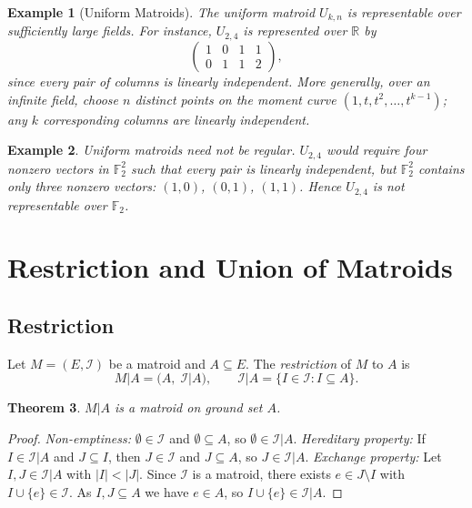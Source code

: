 \documentclass[11pt]{article}
\theoremstyle{plain}
\newtheorem{theorem}{Theorem}[section]
\newtheorem{example}[theorem]{Example}
\theoremstyle{definition}
\begin{document}
\begin{example}[Uniform Matroids]
The uniform matroid $U_{k,n}$ is representable over sufficiently large fields.
For instance, $U_{2,4}$ is represented over $\mathbb{R}$ by
\[
  \begin{pmatrix} 1 & 0 & 1 & 1 \\ 0 & 1 & 1 & 2 \end{pmatrix},
\]
since every pair of columns is linearly independent.
More generally, over an infinite field, choose $n$ distinct points on the
moment curve $(1, t, t^2, \dots, t^{k-1})$; any $k$ corresponding columns
are linearly independent.
\end{example}
 
\begin{example}
Uniform matroids need not be regular.
$U_{2,4}$ would require four nonzero vectors in $\mathbb{F}_2^2$
such that every pair is linearly independent, but $\mathbb{F}_2^2$ contains
only three nonzero vectors: $(1,0)$, $(0,1)$, $(1,1)$.
Hence $U_{2,4}$ is not representable over $\mathbb{F}_2$.
\end{example}
 
\section{Restriction and Union of Matroids}
 
\subsection{Restriction}
 
Let $M = (E, \mathcal{I})$ be a matroid and $A \subseteq E$.
The \emph{restriction} of $M$ to $A$ is
\[
  M|A = (A,\; \mathcal{I}|A), \qquad
  \mathcal{I}|A = \{I \in \mathcal{I} : I \subseteq A\}.
\]
 
\begin{theorem}
$M|A$ is a matroid on ground set $A$.
\end{theorem}
 
\begin{proof}
\emph{Non-emptiness:} $\emptyset \in \mathcal{I}$ and $\emptyset \subseteq A$,
so $\emptyset \in \mathcal{I}|A$.
\emph{Hereditary property:} If $I \in \mathcal{I}|A$ and $J \subseteq I$,
then $J \in \mathcal{I}$ and $J \subseteq A$, so $J \in \mathcal{I}|A$.
\emph{Exchange property:} Let $I, J \in \mathcal{I}|A$ with $|I| < |J|$.
Since $\mathcal{I}$ is a matroid, there exists $e \in J \setminus I$ with
$I \cup \{e\} \in \mathcal{I}$.
As $I, J \subseteq A$ we have $e \in A$, so $I \cup \{e\} \in \mathcal{I}|A$.
\end{proof}
 
\end{document}
